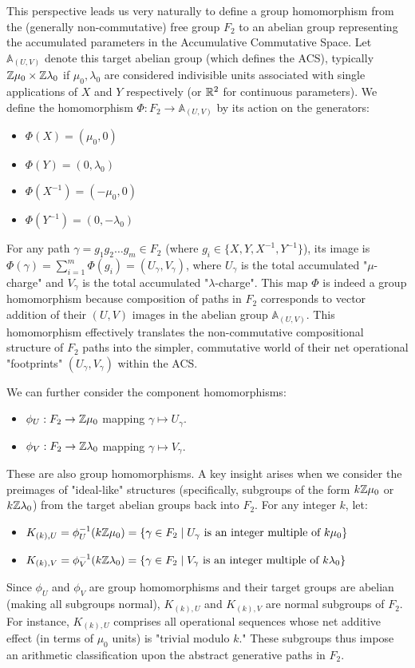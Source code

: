 This perspective leads us very naturally to define a group homomorphism from the (generally non-commutative) free group $F_2$ to an abelian group representing the accumulated parameters in the Accumulative Commutative Space. Let $\mathbb{A}_{(U,V)}$ denote this target abelian group (which defines the ACS), typically $\mathbb{Z}\mu_0 \times \mathbb{Z}\lambda_0$ if $\mu_0, \lambda_0$ are considered indivisible units associated with single applications of $X$ and $Y$ respectively (or $\mathbb{R}^2$ for continuous parameters). We define the homomorphism $\Phi: F_2 \to \mathbb{A}_{(U,V)}$ by its action on the generators:
\begin{itemize}
    \item $\Phi(X) = (\mu_0, 0)$
    \item $\Phi(Y) = (0, \lambda_0)$
    \item $\Phi(X^{-1}) = (-\mu_0, 0)$
    \item $\Phi(Y^{-1}) = (0, -\lambda_0)$
\end{itemize}
For any path $\gamma = g_1 g_2 \dots g_m \in F_2$ (where $g_i \in \{X, Y, X^{-1}, Y^{-1}\}$), its image is $\Phi(\gamma) = \sum_{i=1}^m \Phi(g_i) = (U_\gamma, V_\gamma)$, where $U_\gamma$ is the total accumulated "$\mu$-charge" and $V_\gamma$ is the total accumulated "$\lambda$-charge". This map $\Phi$ is indeed a group homomorphism because composition of paths in $F_2$ corresponds to vector addition of their $(U,V)$ images in the abelian group $\mathbb{A}_{(U,V)}$. This homomorphism effectively translates the non-commutative compositional structure of $F_2$ paths into the simpler, commutative world of their net operational "footprints" $(U_\gamma, V_\gamma)$ within the ACS.

We can further consider the component homomorphisms:
\begin{itemize}
    \item $\phi_U: F_2 \to \mathbb{Z}\mu_0$ mapping $\gamma \mapsto U_\gamma$.
    \item $\phi_V: F_2 \to \mathbb{Z}\lambda_0$ mapping $\gamma \mapsto V_\gamma$.
\end{itemize}
These are also group homomorphisms. A key insight arises when we consider the preimages of "ideal-like" structures (specifically, subgroups of the form $k\mathbb{Z}\mu_0$ or $k\mathbb{Z}\lambda_0$) from the target abelian groups back into $F_2$. For any integer $k$, let:
\begin{itemize}
    \item $K_{(k),U} = \phi_U^{-1}(k\mathbb{Z}\mu_0) = \{ \gamma \in F_2 \mid U_\gamma \text{ is an integer multiple of } k\mu_0 \}$
    \item $K_{(k),V} = \phi_V^{-1}(k\mathbb{Z}\lambda_0) = \{ \gamma \in F_2 \mid V_\gamma \text{ is an integer multiple of } k\lambda_0 \}$
\end{itemize}
Since $\phi_U$ and $\phi_V$ are group homomorphisms and their target groups are abelian (making all subgroups normal), $K_{(k),U}$ and $K_{(k),V}$ are normal subgroups of $F_2$. For instance, $K_{(k),U}$ comprises all operational sequences whose net additive effect (in terms of $\mu_0$ units) is "trivial modulo $k$." These subgroups thus impose an arithmetic classification upon the abstract generative paths in $F_2$.

